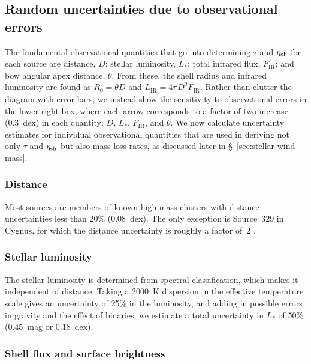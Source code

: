 \subsection{Random uncertainties due to observational errors}
\label{sec:rand-syst-uncert}

The fundamental observational quantities that go into determining
\(\tau\) and \(\eta_{\text{sh}}\) for each source are distance, \(D\); stellar
luminosity, \(L_*\); total infrared flux, \(F_{\text{IR}}\); and bow
angular apex distance, \(\theta\).  From these, the shell radius and
infrared luminosity are found as \(R_0 = \theta D\) and
\(L_{\text{IR}} = 4\pi D^2 F_{\text{IR}}\).  Rather than clutter the
diagram with error bars, we instead show the sensitivity to
observational errors in the lower-right box, where each arrow
corresponds to a factor of two increase (0.3~dex) in each quantity:
\(D\), \(L_*\), \(F_{\text{IR}}\), and \(\theta\).  We now calculate
uncertainty estimates for individual observational quantities that are
used in deriving not only \(\tau\) and \(\eta_{\text{sh}}\) but also mass-loss
rates, as discussed later in \S~\ref{sec:stellar-wind-mass}.

\subsubsection{Distance}
\label{sec:distance}

Most sources are members of known high-mass clusters with distance
uncertainties less than 20\% (0.08~dex). The only exception is
Source~329 in Cygnus, for which the distance uncertainty is roughly a
factor of~2 \citep{Kobulnicky:2018a}.

\subsubsection{Stellar luminosity}
\label{sec:stellar-luminosity}

The stellar luminosity is determined from spectral classification,
which makes it independent of distance.  Taking a \SI{2000}{K}
dispersion in the effective temperature scale \citep{Martins:2005a}
gives an uncertainty of 25\% in the luminosity, and adding in possible
errors in gravity and the effect of binaries, we estimate a total
uncertainty in \(L_*\) of 50\% (0.45~mag or 0.18~dex).

\subsubsection{Shell flux and surface brightness}
\label{sec:shell-flux-surface}

